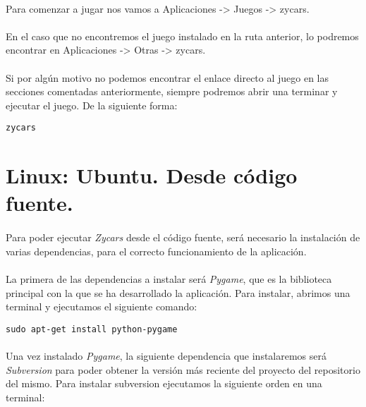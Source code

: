 \paragraph{}
Para comenzar a jugar nos vamos a Aplicaciones -> Juegos -> zycars.

\paragraph{}
En el caso que no encontremos el juego instalado en la ruta anterior, lo podremos encontrar en Aplicaciones -> Otras -> zycars.

\paragraph{}
Si por algún motivo no podemos encontrar el enlace directo al juego en las secciones comentadas anteriormente, siempre podremos
abrir una terminar y ejecutar el juego. De la siguiente forma:

\begin{lstlisting}[style=consola, numbers=none]
zycars
\end{lstlisting}

\section{Linux: Ubuntu. Desde código fuente.}

\paragraph{}
Para poder ejecutar \emph{Zycars} desde el código fuente, será necesario la instalación de varias
dependencias, para el correcto funcionamiento de la aplicación.

\paragraph{}
La primera de las dependencias a instalar será \emph{Pygame}, que es la biblioteca principal con la que
se ha desarrollado la aplicación. Para instalar, abrimos una terminal y ejecutamos el siguiente comando:

\begin{lstlisting}[style=consola, numbers=none]
sudo apt-get install python-pygame
\end{lstlisting}

\paragraph{}
Una vez instalado \emph{Pygame}, la siguiente dependencia que instalaremos será \emph{Subversion} para poder
obtener la versión más reciente del proyecto del repositorio del mismo. Para instalar subversion ejecutamos 
la siguiente orden en una terminal:


